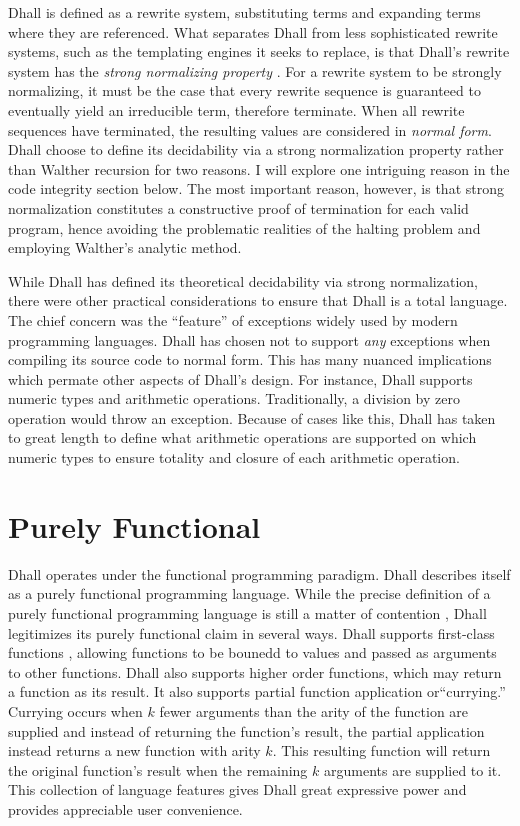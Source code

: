 \documentclass[12pt]{diazessay}
\begin{document}
Dhall is defined as a rewrite system, substituting terms and expanding terms where they are referenced.
What separates Dhall from less sophisticated rewrite systems, such as the templating engines it seeks to replace, is that Dhall's rewrite system has the \emph{strong normalizing property} \cite{bergstra1982strong}.
For a rewrite system to be strongly normalizing, it must be the case that every rewrite sequence is guaranteed to eventually yield an irreducible term, therefore terminate.
When all rewrite sequences have terminated, the resulting values are considered in \emph{normal form}.
Dhall choose to define its decidability via a strong normalization property rather than Walther recursion for two reasons.
I will explore one intriguing reason in the code integrity section below.
The most important reason, however, is that strong normalization constitutes a constructive proof of termination for each valid program, hence avoiding the problematic realities of the halting problem and employing Walther's analytic method.


While Dhall has defined its theoretical decidability via strong normalization, there were other practical considerations to ensure that Dhall is a total language.
The chief concern was the ``feature'' of exceptions widely used by modern programming languages.
Dhall has chosen not to support \emph{any} exceptions when compiling its source code to normal form.
This has many nuanced implications which permate other aspects of Dhall's design.
For instance, Dhall supports numeric types and arithmetic operations.
Traditionally, a division by zero operation would throw an exception.
Because of cases like this, Dhall has taken to great length to define what arithmetic operations are supported on which numeric types to ensure totality and closure of each arithmetic operation.

\section*{Purely Functional}

Dhall operates under the functional programming paradigm.
Dhall describes itself as a purely functional programming language.
While the precise definition of a purely functional programming language is still a matter of contention \cite{sabry1998purely}, Dhall legitimizes its purely functional claim in several ways.
Dhall supports first-class functions \cite{abelson1996structure}, allowing functions to be bounedd to values and passed as arguments to other functions.
Dhall also supports higher order functions, which may return a function as its result.
It also supports partial function application \cite{curry1958combinatory} or``currying.''
Currying occurs when $k$ fewer arguments than the arity \cite{hazewinkel2011encyclopaedia} of the function are supplied and instead of returning the function's result, the partial application instead returns a new function with arity $k$.
This resulting function will return the original function's result when the remaining $k$ arguments are supplied to it.
This collection of language features gives Dhall great expressive power and provides appreciable user convenience.
\end{document}
